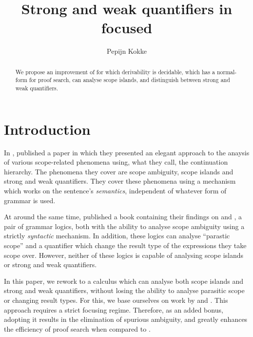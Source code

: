 \documentclass[10pt,a4paper]{llncs}
\begin{document}
\mainmatter%
\title{Strong and weak quantifiers in focused \NLCL}
\author{Pepijn Kokke}
\maketitle

\begin{abstract}
  We propose an improvement of  {\NLCL} for which
  derivability is decidable, which has a normal-form for proof search,
  can analyse scope islands, and distinguish between strong and weak
  quantifiers.
\end{abstract}

\section{Introduction}\label{sec:introduction}

In \citeyear{kiselyov2014}, \citet{kiselyov2014} published a
paper in which they presented an elegant approach to the anaysis of
various scope-related phenomena using, what they call, the
continuation hierarchy.
The phenomena they cover are scope ambiguity, scope islands and strong
and weak quantifiers.
They cover these phenomena using a mechanism which works on the
sentence's \emph{semantics}, independent of whatever form of grammar
is used.

At around the same time, \citet{barker2015} published a book
containing their findings on {\NLLAM} and {\NLCL}, a pair of grammar
logics, both with the ability to analyse scope ambiguity using a
strictly \emph{syntactic} mechanism.
In addition, these logics can analyse ``parastic scope''
\citep{barker2007,barker2015} and a quantifier which change the
result type of the expressions they take scope over.
However, neither of these logics is capable of analysing scope islands
or strong and weak quantifiers.

In this paper, we rework {\NLCL} to a calculus which can analyse both
scope islands and strong and weak quantifiers, without losing
the ability to analyse parasitic scope or changing result types.
For this, we base ourselves on work by \citet{moortgat1996} and
\citet{moortgat2012}. This approach requires a strict focusing
regime. Therefore, as an added bonus, adopting it results in the
elimination of spurious ambiguity, and greatly enhances the efficiency
of proof search when compared to  {\NLCL}.
\end{document}

